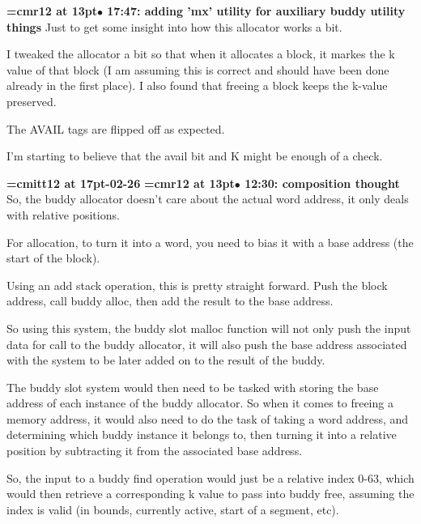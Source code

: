 {\smallskip\noindent\bf\font\titlefont=cmr12 at 13pt\titlefont $\bullet$ 17:47: adding 'mx' utility for auxiliary buddy utility things}\smallskip
Just to get some insight into how this allocator works a bit.
\par

I tweaked the allocator a bit so that when it allocates a block, it markes the k value of that block (I am assuming this is correct and should have been done already in the first place). I also found that freeing a block keeps the k-value preserved.
\par

The AVAIL tags are flipped off as expected.
\par

I'm starting to believe that the avail bit and K might be enough of a check.
\par

{\medskip\noindent\bf\font\titlefont=cmitt12 at 17pt-02-26}\medskip
{\smallskip\noindent\bf\font\titlefont=cmr12 at 13pt\titlefont $\bullet$ 12:30: composition thought }\smallskip
So, the buddy allocator doesn't care about the actual word address, it only deals with relative positions.
\par

For allocation, to turn it into a word, you need to bias it with a base address (the start of the block).
\par

Using an add stack operation, this is pretty straight forward. Push the block address, call buddy alloc, then add the result to the base address.
\par

So using this system, the buddy slot malloc function will not only push the input data for call to the buddy allocator, it will also push the base address associated with the system to be later added on to the result of the buddy.
\par

The buddy slot system would then need to be tasked with storing the base address of each instance of the buddy allocator. So when it comes to freeing a memory address, it would also need to do the task of taking a word address, and determining which buddy instance it belongs to, then turning it into a relative position by subtracting it from the associated base address.
\par

So, the input to a buddy find operation would just be a relative index 0-63, which would then retrieve a corresponding k value to pass into buddy free, assuming the index is valid (in bounds, currently active, start of a segment, etc).
\par

